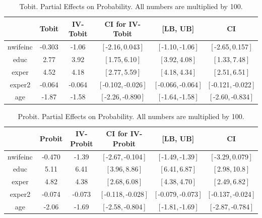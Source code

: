 \documentclass[11pt]{article}
\begin{document}
\begin{table}[!h]
  \begin{center}
  \begin{tabular}{|c|c|cc|cc|}
    \hline\hline
   &  Tobit & IV-Tobit & CI for IV-Tobit & [LB, UB] & CI \\ \hline
    nwifeinc &  -0.303 & -1.06 & [\,-2.16,\,0.043\,] & [\,-1.10,\,-1.06\,] & [\,-2.65,\,0.157\,]\\ 
    educ &  2.77 & 3.92 & [\,1.75,\,6.10\,] & [\,3.92,\,4.08\,] & [\,1.33,\,7.48\,]\\ 
    exper &  4.52 & 4.18 & [\,2.77,\,5.59\,] & [\,4.18,\,4.34\,] & [\,2.51,\,6.51\,]\\ 
    exper2 &  -0.064 & -0.064 & [\,-0.102,\,-0.026\,] & [\,-0.066,\,-0.064\,] & [\,-0.121,\,-0.022\,]\\ 
    age &  -1.87 & -1.58 & [\,-2.26,\,-0.890\,] & [\,-1.64,\,-1.58\,] & [\,-2.60,\,-0.834\,]\\ 
  \hline\hline
  \end{tabular}
  \caption{Tobit. Partial Effects on Probability. All numbers are multiplied by 100.}
  \label{table:Emp-Tobit-PEM-P-w-CI}
  \end{center}
\end{table}


\begin{table}[!h]
  \begin{center}
  \begin{tabular}{|c|c|cc|cc|}
    \hline\hline
   &  Probit & IV-Probit & CI for IV-Probit & [LB, UB] & CI \\ \hline
    nwifeinc &  -0.470 & -1.39 & [\,-2.67,\,-0.104\,] & [\,-1.49,\,-1.39\,] & [\,-3.29,\,0.079\,]\\ 
    educ &  5.11 & 6.41 & [\,3.96,\,8.86\,] & [\,6.41,\,6.87\,] & [\,2.98,\,10.8\,]\\ 
    exper &  4.82 & 4.38 & [\,2.68,\,6.08\,] & [\,4.38,\,4.70\,] & [\,2.49,\,6.82\,]\\ 
    exper2 &  -0.074 & -0.073 & [\,-0.118,\,-0.028\,] & [\,-0.079,\,-0.073\,] & [\,-0.137,\,-0.024\,]\\ 
    age &  -2.06 & -1.69 & [\,-2.58,\,-0.804\,] & [\,-1.81,\,-1.69\,] & [\,-2.87,\,-0.784\,]\\ 
  \hline\hline
  \end{tabular}
  \caption{Probit. Partial Effects on Probability. All numbers are multiplied by 100.}
  \label{table:Emp-Probit-PEM-P-w-CI}
  \end{center}
\end{table}
\end{document}
